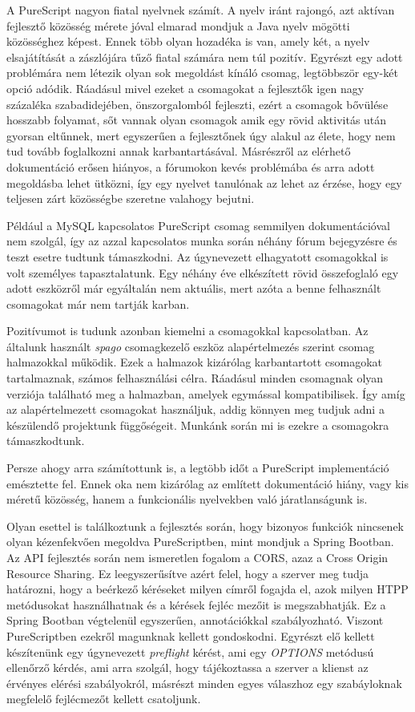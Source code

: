 \documentclass[12pt]{article}
\begin{document}
A PureScript nagyon fiatal nyelvnek számít. A nyelv iránt rajongó, azt aktívan fejlesztő közösség mérete jóval elmarad mondjuk a Java nyelv mögötti közösséghez képest. Ennek több olyan hozadéka is van, amely két, a nyelv elsajátítását a zászlójára tűző fiatal számára nem túl pozitív. Egyrészt egy adott problémára nem létezik olyan sok megoldást kínáló csomag, legtöbbször egy-két opció adódik. Ráadásul mivel ezeket a csomagokat a fejlesztők igen nagy százaléka szabadidejében, önszorgalomból fejleszti, ezért a csomagok bővülése hosszabb folyamat, sőt vannak olyan csomagok amik egy rövid aktivitás után gyorsan eltűnnek, mert egyszerűen a fejlesztőnek úgy alakul az élete, hogy nem tud tovább foglalkozni annak karbantartásával. Másrészről az elérhető dokumentáció erősen hiányos, a fórumokon kevés problémába és arra adott megoldásba lehet ütközni, így egy nyelvet tanulónak az lehet az érzése, hogy egy teljesen zárt közösségbe szeretne valahogy bejutni.

Például a MySQL kapcsolatos PureScript csomag semmilyen dokumentációval nem szolgál, így az azzal kapcsolatos munka során néhány fórum bejegyzésre és teszt esetre tudtunk támaszkodni. Az úgynevezett elhagyatott csomagokkal is volt személyes tapasztalatunk. Egy néhány éve elkészített rövid összefoglaló egy adott eszközről már egyáltalán nem aktuális, mert azóta a benne felhasznált csomagokat már nem tartják karban.

Pozitívumot is tudunk azonban kiemelni a csomagokkal kapcsolatban. Az általunk használt \textit{spago} csomagkezelő eszköz alapértelmezés szerint csomag halmazokkal működik. Ezek a halmazok kizárólag karbantartott csomagokat tartalmaznak, számos felhasználási célra. Ráadásul minden csomagnak olyan verziója található meg a halmazban, amelyek egymással kompatibilisek. Így amíg az alapértelmezett csomagokat használjuk, addig könnyen meg tudjuk adni a készülendő projektunk függőségeit. Munkánk során mi is ezekre a csomagokra támaszkodtunk.

Persze ahogy arra számítottunk is, a legtöbb időt a PureScript implementáció emésztette fel. Ennek oka nem kizárólag az említett dokumentáció hiány, vagy kis méretű közösség, hanem a funkcionális nyelvekben való járatlanságunk is.

Olyan esettel is találkoztunk a fejlesztés során, hogy bizonyos funkciók nincsenek olyan kézenfekvően megoldva PureScriptben, mint mondjuk a Spring Bootban. Az API fejlesztés során nem ismeretlen fogalom a CORS, azaz a Cross Origin Resource Sharing. Ez leegyszerűsítve azért felel, hogy a szerver meg tudja határozni, hogy a beérkező kéréseket milyen címről fogajda el, azok milyen HTPP metódusokat használhatnak és a kérések fejléc mezőit is megszabhatják. Ez a Spring Bootban végtelenül egyszerűen, annotációkkal szabályozható. Viszont PureScriptben ezekről magunknak kellett gondoskodni. Egyrészt elő kellett készítenünk egy úgynevezett \textit{preflight} kérést, ami egy \textit{OPTIONS} metódusú ellenőrző kérdés, ami arra szolgál, hogy tájékoztassa a szerver a klienst az érvényes elérési szabályokról, másrészt minden egyes válaszhoz egy szabáyloknak megfelelő fejlécmezőt kellett csatoljunk.
\end{document}
